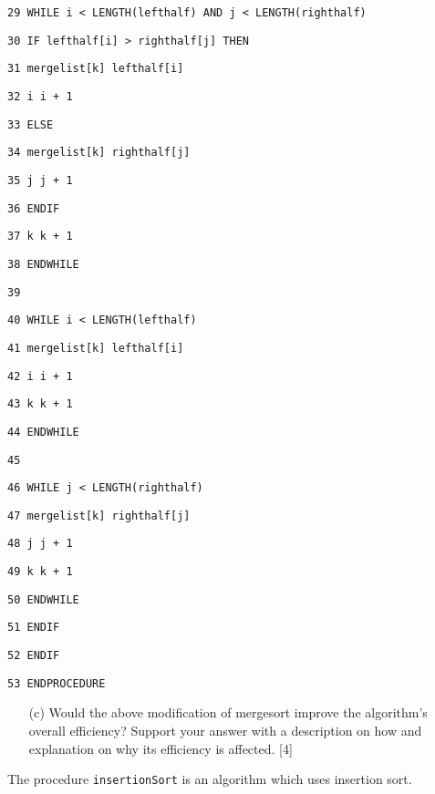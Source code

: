 \begin{minipage}[t]{1\columnwidth}
\texttt{29 \qquad{}\qquad{}\qquad{}WHILE i < LENGTH(lefthalf) AND
j < LENGTH(righthalf) }

\texttt{30 \qquad{}\qquad{}\qquad{}\qquad{}IF lefthalf{[}i{]}
> righthalf{[}j{]} THEN }

\texttt{31 \qquad{}\qquad{}\qquad{}\qquad{}\qquad{}mergelist{[}k{]}
\textleftarrow{} lefthalf{[}i{]} }

\texttt{32 \qquad{}\qquad{}\qquad{}\qquad{}\qquad{}i \textleftarrow{}
i + 1 }

\texttt{33 \qquad{}\qquad{}\qquad{}\qquad{}ELSE }

\texttt{34 \qquad{}\qquad{}\qquad{}\qquad{}\qquad{}mergelist{[}k{]}
\textleftarrow{} righthalf{[}j{]}}

\texttt{35 \qquad{}\qquad{}\qquad{}\qquad{}\qquad{}j \textleftarrow{}
j + 1 }

\texttt{36 \qquad{}\qquad{}\qquad{}\qquad{}ENDIF }

\texttt{37 \qquad{}\qquad{}\qquad{}\qquad{}k \textleftarrow{}
k + 1 }

\texttt{38 \qquad{}\qquad{}\qquad{}ENDWHILE }

\texttt{39 }

\texttt{40 \qquad{}\qquad{}\qquad{}WHILE i < LENGTH(lefthalf) }

\texttt{41 \qquad{}\qquad{}\qquad{}\qquad{}mergelist{[}k{]} \textleftarrow{}
lefthalf{[}i{]} }

\texttt{42 \qquad{}\qquad{}\qquad{}\qquad{}i \textleftarrow{}
i + 1 }

\texttt{43 \qquad{}\qquad{}\qquad{}\qquad{}k \textleftarrow{}
k + 1}

\texttt{44 \qquad{}\qquad{}\qquad{}ENDWHILE}

\texttt{45 }

\texttt{46 \qquad{}\qquad{}\qquad{}WHILE j < LENGTH(righthalf)}

\texttt{47 \qquad{}\qquad{}\qquad{}\qquad{}mergelist{[}k{]} \textleftarrow{}
righthalf{[}j{]} }

\texttt{48 \qquad{}\qquad{}\qquad{}\qquad{}j \textleftarrow{}
j + 1 }

\texttt{49 \qquad{}\qquad{}\qquad{}\qquad{}k \textleftarrow{}
k + 1 }

\texttt{50 \qquad{}\qquad{}\qquad{}ENDWHILE }

\texttt{51 \qquad{}\qquad{}ENDIF }

\texttt{52 \qquad{}ENDIF }

\texttt{53 ENDPROCEDURE}%
\end{minipage}
\begin{enumerate}
\item[(c)]  Would the above modification of mergesort improve the algorithm\textquoteright s
overall efficiency? Support your answer with a description on how
and explanation on why its efficiency is affected. \hfill{} {[}4{]}
\end{enumerate}
The procedure \texttt{insertionSort} is an algorithm which uses insertion
sort. 

